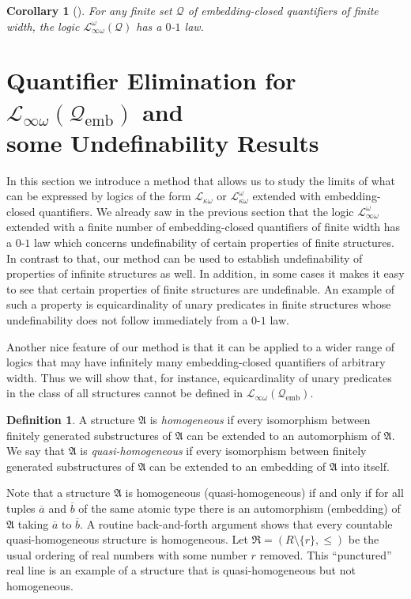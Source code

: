 \documentclass{ndjflart}
\theoremstyle{plain}
\newtheorem{corollary}[conjecture]{Corollary}
\theoremstyle{definition}
\newtheorem{definition}[conjecture]{Definition}
\numberwithin{equation}{section}
\DeclareMathOperator{\emb}{emb}
\begin{document}
\begin{corollary}[\cite{Dawar:2010}]
For any finite set $\mathcal{Q}$ of embedding-closed quantifiers of finite width,
the logic $\mathcal{L}^{\omega}_{\infty\omega}(\mathcal{Q})$ has a $0$-$1$ law.
\end{corollary}


\section{Quantifier Elimination for $\mathcal{L}_{\infty \omega}(\mathcal{Q}_{\emb})$ 
	and \\ some Undefinability Results}\label{chain_section}

In this section we introduce a method that allows us to study the limits of what
can be expressed by logics of the form
$\mathcal{L}_{\kappa\omega}$ or $\mathcal{L}^{\omega}_{\kappa\omega}$ extended
with embedding-closed quantifiers.
We already saw in the previous section that the logic
$\mathcal{L}_{\infty\omega}^{\omega}$ extended with a finite number of
embedding-closed quantifiers of finite width has a $0$-$1$ law
which concerns undefinability of certain properties of finite structures.
In contrast to that, our method can be used to establish undefinability of
properties of infinite structures as well. In addition, in some cases it makes
it easy to see that certain properties of finite structures are undefinable.
An example of such a property is equicardinality of unary predicates in finite
structures whose undefinability does not follow immediately from a $0$-$1$ law.

Another nice feature of our method is that it can be applied to a wider range of
logics that may have infinitely many embedding-closed quantifiers of arbitrary
width.
Thus we will show that, for instance, equicardinality of unary predicates in the
class of all structures cannot be defined in
$\mathcal{L}_{\infty \omega}(\mathcal{Q}_{\emb})$.

\begin{definition}
A structure $\mathfrak{A}$ is \emph{homogeneous} if every isomorphism between
finitely generated substructures of $\mathfrak{A}$ can be extended to an
automorphism of $\mathfrak{A}$. We say that $\mathfrak{A}$ is
\emph{quasi-homogeneous} if every isomorphism between finitely generated
substructures of $\mathfrak{A}$ can be extended to an embedding of
$\mathfrak{A}$ into itself.
\end{definition}

Note that a structure $\mathfrak{A}$ is homogeneous (quasi-homogeneous) if and
only if for all tuples $\overline{a}$ and $\overline{b}$ of the same atomic type
there is an automorphism (embedding) of $\mathfrak{A}$ taking
$\overline{a}$ to $\overline{b}$.
A routine back-and-forth argument shows that every countable quasi-homogeneous
structure is homogeneous.
Let $\mathfrak{R} = (R\setminus\{r\},\leq)$ be the usual ordering of real
numbers with some number $r$ removed.
This ``punctured'' real line is an example of a structure that is
quasi-homogeneous but not homogeneous.
\end{document}
